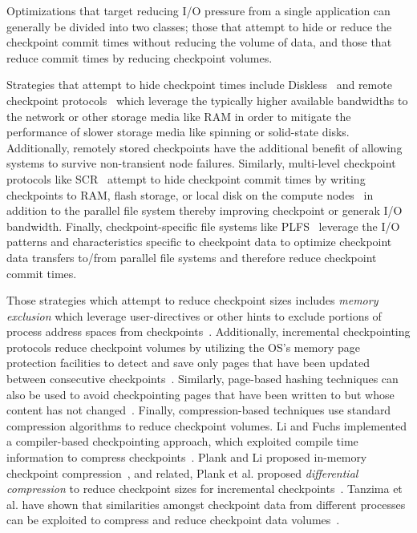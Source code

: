 Optimizations that target reducing I/O pressure from a single application can
generally be divided into two classes; those that attempt to hide or reduce the
checkpoint commit times without reducing the volume of data, and those that
reduce commit times by reducing checkpoint volumes. 

Strategies that attempt to hide checkpoint times include
Diskless~\cite{Plank98Diskless} and remote checkpoint
protocols~\cite{Cornwell11RemoteBLCR,Stellner96CoCheck,Zandy99ProcessHijacking}
which leverage the typically higher available bandwidths to the network or
other storage media like RAM in order to mitigate the performance of slower
storage media like spinning or solid-state disks. Additionally, remotely stored
checkpoints have the additional benefit of allowing systems to survive
non-transient node failures. Similarly, multi-level checkpoint protocols like
SCR~\cite{Moody10SCR,Vaidya95TwoLevel} attempt to hide checkpoint commit times
by writing checkpoints to RAM, flash storage, or local disk on the compute
nodes~\cite{Kougkas2016} in addition to the parallel file system thereby
improving checkpoint or generak I/O bandwidth.  Finally, checkpoint-specific
file systems like PLFS~\cite{Bent09PLFS} leverage the I/O patterns and
characteristics specific to checkpoint data to optimize checkpoint data
transfers to/from parallel file systems and therefore reduce checkpoint commit
times.

Those strategies which attempt to reduce checkpoint sizes includes \emph{memory
exclusion} which leverage user-directives or other hints to exclude portions of
process address spaces from checkpoints~\cite{Plank99MemoryExclusion}.
Additionally, incremental checkpointing protocols reduce checkpoint volumes by
utilizing the OS's memory page protection facilities to detect and save only
pages that have been updated between consecutive
checkpoints~\cite{Bronevetsky09Compiler,
Chen97CLIP,Elnozahy92ConsistentCheckpointing,Li94ConcurrentCheckpointing,
Plank94Libckpt,Paun10IncrementalWeibull,Kiswany08stdchk}.  Similarly, page-based
hashing techniques can also be used to avoid checkpointing pages that have been
written to but whose content has not changed~\cite{Ferreira11Libhashckpt}.
Finally, compression-based techniques use standard compression algorithms to
reduce checkpoint volumes.  Li and Fuchs implemented a compiler-based
checkpointing approach, which exploited compile time information to compress
checkpoints~\cite{Li90CATCH}.  Plank and Li proposed in-memory checkpoint
compression~\cite{Plank94ICKP}, and related, Plank et al. proposed
\textit{differential compression} to reduce checkpoint sizes for incremental
checkpoints~\cite{Plank95CompressedDiff}.  Tanzima et al. have shown that
similarities amongst checkpoint data from different processes can be exploited
to compress and reduce checkpoint data volumes~\cite{tanzima12mcrengine}.

